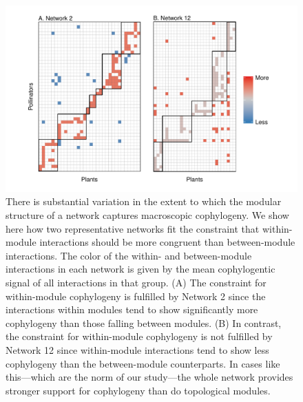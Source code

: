 \documentclass{article}
\begin{document}
\begin{figure}[ht]
\centerline{\includegraphics*[width=1.00\textwidth]{fig_compare}}
\caption{There is substantial variation in the extent to which the modular structure of a network captures macroscopic cophylogeny. We show here how two representative networks fit the constraint that within-module interactions should be more congruent than between-module interactions. The color of the within- and between-module interactions in each network is given by the mean cophylogentic signal of all interactions in that group. (A) The constraint for within-module cophylogeny is fulfilled by Network 2 since the interactions within modules tend to show significantly more cophylogeny than those falling between modules. (B) In contrast, the constraint for within-module cophylogeny is not fulfilled by Network 12 since within-module interactions tend to show less cophylogeny than the between-module counterparts. In cases like this---which are the norm of our study---the whole network provides stronger support for cophylogeny than do topological modules.}
\label{fig:netcomparison}
\end{figure}
\clearpage



\clearpage

\end{document}
